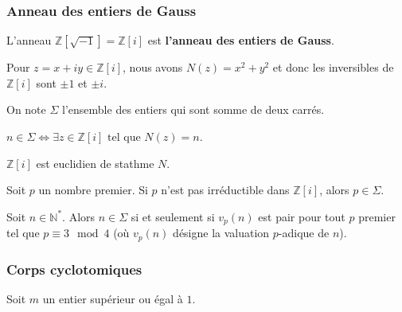   \subsubsection{Anneau des entiers de Gauss}

  \begin{definition}
    L'anneau $\mathbb{Z}[\sqrt{-1}] = \mathbb{Z}[i]$ est \textbf{l'anneau des entiers de Gauss}.
  \end{definition}

  \begin{example}
    Pour $z = x+iy \in \mathbb{Z}[i]$, nous avons $N(z) = x^2+y^2$ et donc les inversibles de $\mathbb{Z}[i]$ sont $\pm 1$ et $\pm i$.
  \end{example}


  \begin{notation}
    On note $\Sigma$ l'ensemble des entiers qui sont somme de deux carrés.
  \end{notation}

  \begin{remark}
    $n \in \Sigma \iff \exists z \in \mathbb{Z}[i] \text{ tel que } N(z)=n$.
  \end{remark}

  \begin{lemma}
    $\mathbb{Z}[i]$ est euclidien de stathme $N$.
  \end{lemma}

  \begin{lemma}
    Soit $p$ un nombre premier. Si $p$ n'est pas irréductible dans $\mathbb{Z}[i]$, alors $p \in \Sigma$.
  \end{lemma}


  \begin{theorem}
    Soit $n \in \mathbb{N}^*$. Alors $n \in \Sigma$ si et seulement si $v_p(n)$ est pair pour tout $p$ premier tel que $p \equiv 3 \mod 4$ (où $v_p(n)$ désigne la valuation $p$-adique de $n$).
  \end{theorem}

  \subsubsection{Corps cyclotomiques}

  Soit $m$ un entier supérieur ou égal à $1$.


